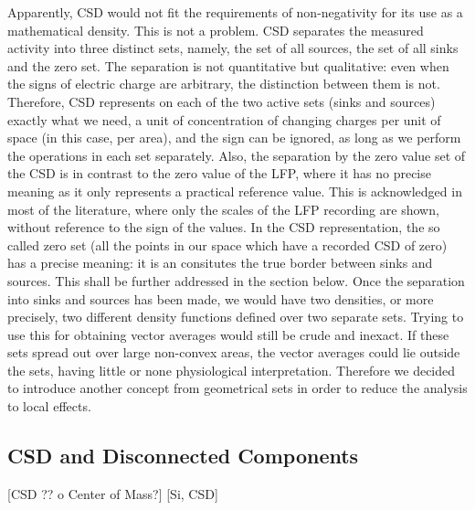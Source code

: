 \documentclass[letterpaper,12pts]{article}
\newcommand{\komment}[1]{{\color{red} [#1]}}
\newcommand{\romment}[1]{{\color{blue} [#1]}}
\begin{document}
Apparently, CSD would not fit the requirements of non-negativity for its use as a mathematical density. This is not a problem.  CSD separates the measured activity into three distinct sets, namely, the set of all sources, the set of all sinks and the zero set. The separation is not quantitative but qualitative: even when the signs of electric charge are arbitrary, the distinction between them is not. Therefore, CSD represents on each of the two active sets (sinks and sources) exactly what we need, a unit of concentration of changing charges per unit of space (in this case, per area), and the sign can be ignored, as long as we perform the operations in each set separately. Also, the separation by the zero value set of the CSD is in contrast to the zero value of the LFP, where it has no precise meaning as it only represents a practical reference value. This is acknowledged in most of the literature, where only the scales of the LFP recording are shown, without reference to the sign of the values. In the CSD representation,  the so called zero set (all the points in our space which have a recorded CSD of zero)  has a precise meaning: it is an consitutes the true  border between sinks and sources. This shall be further addressed in the section below.
Once the separation into sinks and sources has been made, we would have two densities, or more precisely, two different density functions defined over two separate sets. Trying to use this for obtaining vector averages would still be crude and inexact. If these sets spread out over large non-convex areas, the vector averages could lie outside the sets, having little or none physiological interpretation. Therefore we decided to introduce another concept from geometrical sets in order to reduce the analysis to local effects.


\subsection{CSD and Disconnected Components}
\romment{CSD ?? o Center of Mass?}
\komment{Si, CSD}
  
\end{document}
